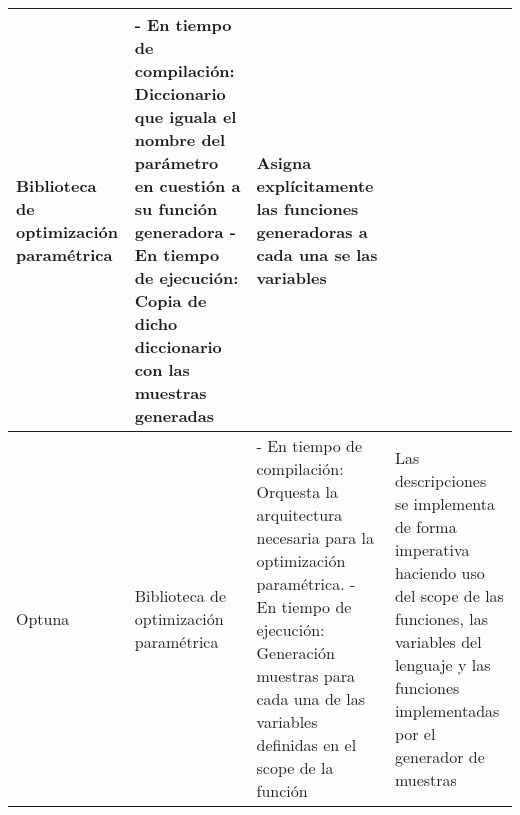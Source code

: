 \begin{longtable}{  p{2.5cm}  p{4cm}  p{6.8cm}  p{6.5cm} }
    Biblioteca de optimización paramétrica                                                                                                                                                                                                                                                                                                                        &
    - En tiempo de compilación: Diccionario que iguala el nombre del parámetro en cuestión a su función generadora \newline- En tiempo de ejecución: Copia de dicho diccionario con las muestras generadas                                                                                                                                                        &
    Asigna explícitamente las funciones generadoras a cada una se las variables                                                                                                                                                                                                                                                                                     \\
    \hline
    \rowcolor{lavender}
    Optuna                                                                                                                                                                                                                                                                                                                                                        &
    Biblioteca de optimización paramétrica                                                                                                                                                                                                                                                                                                                        &
    - En tiempo de compilación: Orquesta la arquitectura necesaria para la optimización paramétrica. \newline- En tiempo de ejecución: Generación muestras para cada una de las variables definidas en el scope de la función                                                                                                                                     &
    Las descripciones se implementa de forma imperativa haciendo uso del scope de las funciones, las variables del lenguaje y las funciones implementadas por el generador de muestras                                                                                                                                                                              \\

\end{longtable}
